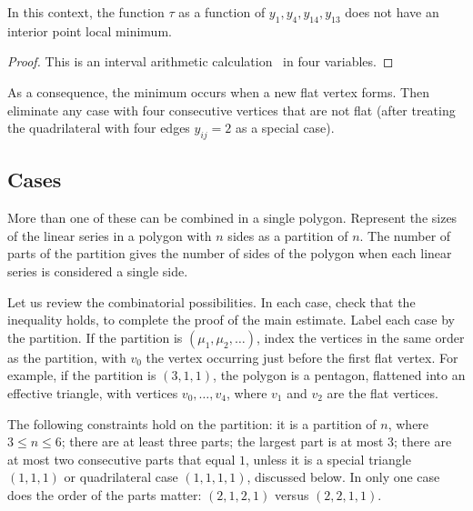 \begin{lemma}
In this context, the function $\tau$ as a function of $y_1,y_4,y_{14},y_{13}$ does not have an interior point local minimum.
\end{lemma}

\begin{proof} This is an interval arithmetic calculation~\cite[cc:qua]{hales:2009:nonlinear} in four variables.%
\end{proof}

As a consequence, the minimum occurs when a new flat vertex forms.   Then eliminate any case with four consecutive vertices that are not flat (after treating the quadrilateral with four edges $y_{ij}=2$ as a special case).

\subsection{Cases}

More than one of these can be combined in a single polygon.   Represent the sizes of the linear series in a polygon with $n$ sides as a partition of $n$.
The number of parts of the partition gives the number of sides of the polygon when each linear series is considered a single side. 

Let us review the combinatorial possibilities.  In each case,  check that the inequality holds, to complete the proof of the main estimate.  Label each 
case by the partition.  If the partition is $(\mu_1,\mu_2,\ldots)$, 
index the vertices in the same order as the partition, with $v_0$
the vertex occurring just before the first flat vertex.  For example,
if the partition is $(3,1,1)$, the polygon is a pentagon, flattened into
an effective triangle, with vertices $v_0,\ldots,v_4$, where $v_1$ and $v_2$
are the flat vertices.

The following constraints hold on the partition: it is
a partition of $n$, where $3\le n\le 6$; there
are at least three parts; the largest part is at most $3$;  there are
at most two consecutive parts that equal $1$, unless it is a special triangle $(1,1,1)$ or
quadrilateral case $(1,1,1,1)$, discussed below.  In only one case
does the order of the parts matter: $(2,1,2,1)$ versus $(2,2,1,1)$.


